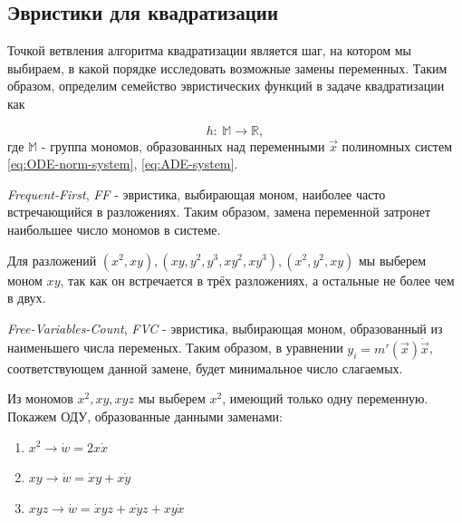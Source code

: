 \subsection{Эвристики для квадратизации} \label{sec:quad-heuristics}

Точкой ветвления алгоритма квадратизации является шаг, на котором мы выбираем, в какой порядке исследовать возможные замены переменных. Таким образом, определим семейство эвристических функций в задаче квадратизации как 

\begin{equation}
    h:\ \mathbb{M} \longrightarrow \mathbb{R},
\end{equation}
где $\mathbb{M}$ - группа мономов, образованных над переменными $\vec x$ полиномных систем \eqref{eq:ODE-norm-system}, \eqref{eq:ADE-system}. 

\begin{heuristics} \label{heur:FF}
    \textit{Frequent-First}, \textit{FF} - эвристика, выбирающая моном, наиболее часто встречающийся в разложениях. Таким образом, замена переменной затронет наибольшее число мономов в системе.
    
    \begin{example}
        Для разложений $(x^2, xy), (xy, y^2, y^3, xy^2, xy^3), (x^2, y^2, xy)$ мы выберем моном $xy$, так как он встречается в трёх разложениях, а остальные не более чем в двух.
    \end{example}
\end{heuristics}

\begin{heuristics} \label{heur:FVC}
    \textit{Free-Variables-Count}, \textit{FVC} - эвристика, выбирающая моном, образованный из наименьшего числа    переменых. Таким образом, в уравнении $y_i = m'(\vec x) \dot{\vec x}$, соответствующем данной замене, будет минимальное число слагаемых.
    
    \begin{example}
        Из мономов $x^2, xy, xyz$ мы выберем $x^2$, имеющий только одну переменную. Покажем ОДУ, образованные данными заменами:
        \begin{enumerate}
            \item $x^2 \longrightarrow \dot w = 2x \dot x$
            \item $xy \longrightarrow \dot w = \dot x y + x \dot y$
            \item $xyz \longrightarrow \dot w = \dot x yz + x \dot y z + xy \dot x$
        \end{enumerate}
    \end{example}
\end{heuristics}

